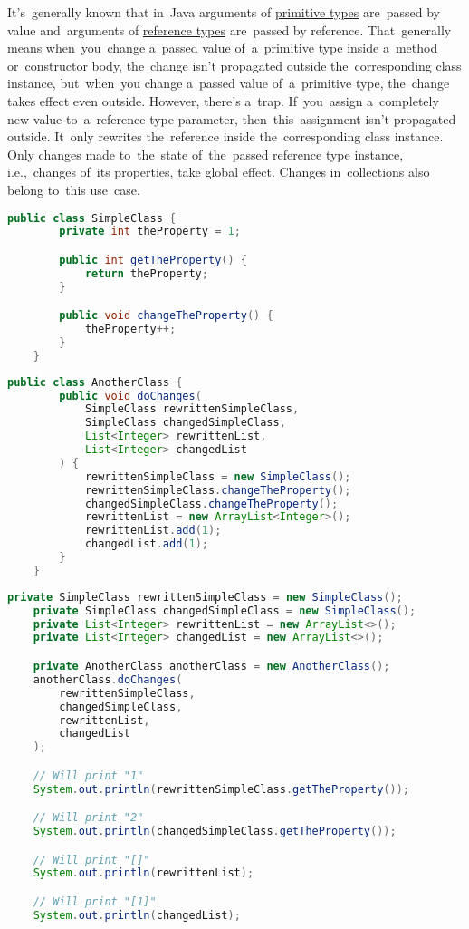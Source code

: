 It's~generally known that in~Java arguments of \hyperref[javaprimitivetypes]{primitive types} are~passed by value and~arguments of \hyperref[javareferencetypes]{reference types} are~passed by reference.
That~generally means when~you~change a~passed value of~a~primitive type inside a~method or~constructor body, the~change isn't propagated outside the~corresponding class instance, but~when~you change a~passed value of~a~primitive type, the~change takes effect even outside.
However, there's a~trap.
If~you~assign a~completely new value to~a~reference type parameter, then~this~assignment isn't propagated outside.
It~only rewrites the~reference inside the~corresponding class instance.
Only changes made to~the~state of~the~passed reference type instance, i.e.,~changes of~its properties, take global effect.
Changes in~collections also belong to~this use~case.

\example
\begin{lstlisting}[language=Java, title={Class to be a type of method parameter}]
    public class SimpleClass {
        private int theProperty = 1;

        public int getTheProperty() {
            return theProperty;
        }

        public void changeTheProperty() {
            theProperty++;
        }
    }
\end{lstlisting}
\begin{lstlisting}[language=Java, title={Class with method changing reference type parameters}]
    public class AnotherClass {
        public void doChanges(
            SimpleClass rewrittenSimpleClass,
            SimpleClass changedSimpleClass,
            List<Integer> rewrittenList,
            List<Integer> changedList
        ) {
            rewrittenSimpleClass = new SimpleClass();
            rewrittenSimpleClass.changeTheProperty();
            changedSimpleClass.changeTheProperty();
            rewrittenList = new ArrayList<Integer>();
            rewrittenList.add(1);
            changedList.add(1);
        }
    }
\end{lstlisting}
\begin{lstlisting}[language=Java, title={Behavior}]
    private SimpleClass rewrittenSimpleClass = new SimpleClass();
    private SimpleClass changedSimpleClass = new SimpleClass();
    private List<Integer> rewrittenList = new ArrayList<>();
    private List<Integer> changedList = new ArrayList<>();

    private AnotherClass anotherClass = new AnotherClass();
    anotherClass.doChanges(
        rewrittenSimpleClass,
        changedSimpleClass,
        rewrittenList,
        changedList
    );

    // Will print "1"
    System.out.println(rewrittenSimpleClass.getTheProperty());

    // Will print "2"
    System.out.println(changedSimpleClass.getTheProperty());

    // Will print "[]"
    System.out.println(rewrittenList);

    // Will print "[1]"
    System.out.println(changedList);
\end{lstlisting}

